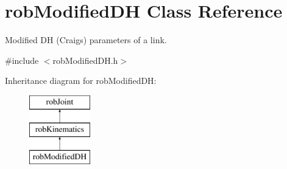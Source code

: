 \hypertarget{classrob_modified_d_h}{}\section{rob\+Modified\+D\+H Class Reference}
\label{classrob_modified_d_h}


Modified D\+H (Craig\textquotesingle{}s) parameters of a link.  




{\ttfamily \#include $<$rob\+Modified\+D\+H.\+h$>$}

Inheritance diagram for rob\+Modified\+D\+H\+:\begin{figure}[H]
\begin{center}
\leavevmode
\includegraphics[height=3.000000cm]{dc/d40/classrob_modified_d_h}
\end{center}
\end{figure}
